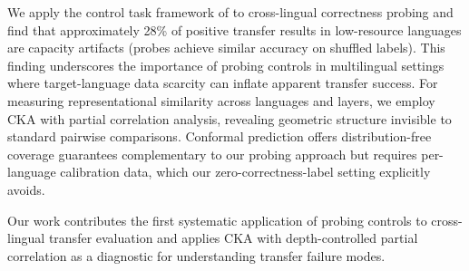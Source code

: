 We apply the control task framework of \citet{hewitt2019control} to cross-lingual correctness probing and find that approximately 28\% of positive transfer results in low-resource languages are capacity artifacts (probes achieve similar accuracy on shuffled labels). This finding underscores the importance of probing controls in multilingual settings where target-language data scarcity can inflate apparent transfer success. For measuring representational similarity across languages and layers, we employ CKA \cite{kornblith2019cka} with partial correlation analysis, revealing geometric structure invisible to standard pairwise comparisons. Conformal prediction \cite{angelopoulos2023conformal} offers distribution-free coverage guarantees complementary to our probing approach but requires per-language calibration data, which our zero-correctness-label setting explicitly avoids.

Our work contributes the first systematic application of probing controls to cross-lingual transfer evaluation and applies CKA with depth-controlled partial correlation as a diagnostic for understanding transfer failure modes.
